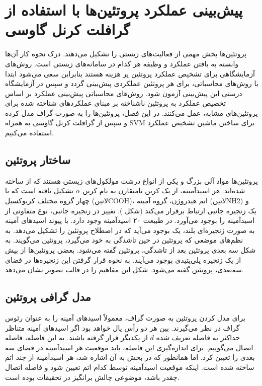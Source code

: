 \chapter{پیش‌بینی عملکرد پروتئین‌ها با استفاده از گرافلت کرنل گاوسی}
پروتئین‌ها بخش مهمی از فعالیت‌های زیستی را تشکیل می‌دهند. درک نحوه کار آن‌ها وابسته به یافتن عملکرد و وظیفه هر کدام در سامانه‌های زیستی است. روش‌های آزمایشگاهی برای تشخیص عملکرد پروتئین پر هزینه هستند بنابراین سعی می‌شود ابتدا با روش‌های محاسباتی، برای هر پروتئین عملکردی پیش‌بینی گردد و سپس در آزمایشگاه درستی این پیش‌بینی آزمون شود. روش‌های محاسباتی پیش‌بینی عملکرد بر اساس تخصیص عملکرد به پروتئین ناشناخته بر مبنای عملکردهای شناخته شده برای پروتئین‌های مشابه، عمل می‌کنند. در این فصل، پروتئین‌ها را به صورت گراف مدل کرده و سپس از گرافلت کرنل گاوسی به همراه SVM برای ساختن ماشین تشخیص عملکرد استفاده می‌کنیم.

\section{ساختار پروتئین}\label{sec:protein-structure}
پروتئین‌ها مواد آلی بزرگ و یکی از انواع درشت مولکول‌های زیستی هستند که از  ساخته شده‌اند. هر اسیدآمینه، از یک کربن نامتقارن به نام کربن $\alpha$ تشکیل یافته است که با چهار گروه مختلف کربوکسیل (‌لاتین{COOH})، اتم هیدروژن، گروه آمینه (‌لاتین{NH2}) و یک زنجیره جانبی ارتباط برقرار می‌کند (شکل ). تغییر در زنجیره جانبی، نوع متفاوتی از اسیدآمینه را بوجود می‌آورد. در طبیعت ۲۰ اسیدآمینه وجود دارد. با پیوند اسیدهای آمینه به صورت زنجیره‌‌ای بلند، یک  بوجود می‌آید که در اصطلاح  پروتئین را تشکیل می‌دهد. به نظم‌های موضعی که پروتئین در حین تاشدگی به خود می‌گیرد،  پروتئین می‌گویند. به شکل سه بعدی پروتئین بعد از تاشدگی،  پروتئین گفته می‌شود. بعضی پروتئین‌ها از بیش از یک زنجیره پلی‌پتیدی بوجود می‌آیند. به نحوه قرار گرفتن این زنجیره‌ها در فضای سه‌بعدی،  پروتئین گفته می‌شود. شکل  این مفاهیم را در قالب تصویر نشان می‌دهد.

\section{مدل گرافی پروتئین}
برای مدل کردن پروتئین به صورت گراف، معمولاً اسید‌های آمینه را به عنوان رئوس گراف در نظر می‌گیرند. بین هر دو رأس یال خواهد بود اگر اسیدهای آمینه متناظر حداکثر به فاصله تعریف شده $d$ از یکدیگر قرار گرفته باشند. به این فاصله، فاصله اتصال می‌گوییم. برای اندازه‌گیری این فاصله، باید موقعیت هر اسیدآمینه در فضای سه بعدی را تعیین کرد. اما همانطور که در بخش  به آن اشاره شد، هر اسیدآمینه از چند اتم ساخته شده است. اینکه موقعیت اسیدآمینه توسط کدام اتم تعیین شود و فاصله اتصال چقدر باشد، موضوعی چالش برانگیز در تحقیقات بوده است.